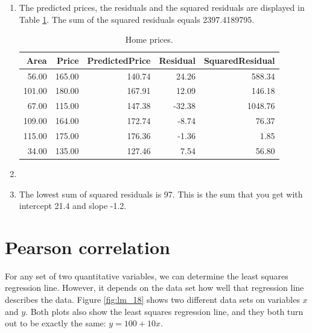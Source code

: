 \documentclass[]{report}\usepackage[]{graphicx}\usepackage[]{color}
\begin{document}
\begin{enumerate}

\item The predicted prices, the residuals and the squared residuals are displayed in Table \ref{tab:lm_17}. The sum of the squared residuals equals 2397.4189795.

\begin{table}[ht]
\centering
\caption{Home prices.} 
\label{tab:lm_17}
\begin{tabular}{rrrrr}
  \hline
Area & Price & PredictedPrice & Residual & SquaredResidual \\ 
  \hline
56.00 & 165.00 & 140.74 & 24.26 & 588.34 \\ 
  101.00 & 180.00 & 167.91 & 12.09 & 146.18 \\ 
  67.00 & 115.00 & 147.38 & -32.38 & 1048.76 \\ 
  109.00 & 164.00 & 172.74 & -8.74 & 76.37 \\ 
  115.00 & 175.00 & 176.36 & -1.36 & 1.85 \\ 
  34.00 & 135.00 & 127.46 & 7.54 & 56.80 \\ 
   \hline
\end{tabular}
\end{table}

\item

\item The lowest sum of squared residuals is 97. This is the sum that you get with intercept 21.4 and slope -1.2.

\end{enumerate}







\section{Pearson correlation}

For any set of two quantitative variables, we can determine the least squares regression line. However, it depends on the data set how well that regression line describes the data. Figure \ref{fig:lm_18} shows two different data sets on variables $x$ and $y$. Both plots also show the least squares regression line, and they both turn out to be exactly the same: $y=100+10x$.
\end{document}
